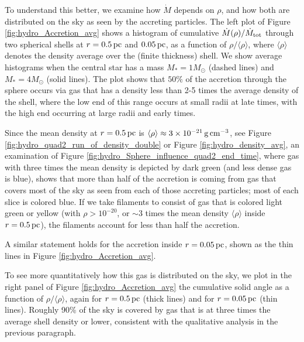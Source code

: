 \documentclass[../dissertation.tex]{subfiles}
\begin{document}
To understand this better, we examine how $\dot M$ depends on $\rho$, and how both
are distributed on the sky as seen by the accreting particles.
The left plot of Figure \ref{fig:hydro_Accretion_avg} shows a histogram of 
cumulative $\dot{M}(\rho)/\dot M_{\rm tot}$ through two spherical shells
at $r = 0.5 \,\rm pc$ and $0.05 \,\rm pc$, 
as a function of $\rho/\langle \rho\rangle$, where $\langle\rho\rangle$ 
denotes the density average over the (finite thickness) shell. 
We show average histograms when the central star has a mass $M_*=1M_\odot$ (dashed lines)
and $M_*=4M_\odot$ (solid lines).  The plot shows that $50\%$ of the accretion through the
sphere occurs via gas that has a density less than 2-5 times the average 
density of the shell,
where the low end of this range occurs at small radii at late times, with the high
end occurring at large radii and early times.

Since the mean density at $r=0.5\,\rm pc$ is 
$\langle\rho\rangle\approx 3\times10^{-21}\,\rm g\,\rm cm^{-3}$, see 
Figure \ref{fig:hydro_quad2_run_of_density_double} or Figure \ref{fig:hydro_density_avg}, an examination of 
Figure \ref{fig:hydro_Sphere_influence_quad2_end_time}, where gas with three times the 
mean density is depicted by dark green (and less dense gas is blue), shows that more than
half of the accretion is coming from gas that covers most of the sky as seen 
from each of those accreting particles; most of each slice is colored blue. If we take 
filaments to consist of gas that is
colored light green or yellow (with $\rho>10^{-20}$, or $\sim 3$ times 
the mean density $\langle\rho\rangle$ inside $r=0.5\,\rm pc$),
the filaments account for less than half the accretion.

A similar statement holds for the accretion inside $r=0.05\,\rm pc$, shown as the thin lines in Figure 
\ref{fig:hydro_Accretion_avg}.

To see more quantitatively how this gas is distributed on the sky,
we plot in the right panel of Figure \ref{fig:hydro_Accretion_avg} the cumulative solid 
angle as a function of $\rho/\langle \rho\rangle$, again for $r=0.5\,\rm pc$ (thick lines) 
and for $r=0.05\,\rm pc$ (thin lines).  Roughly 90\% of the sky is
covered by gas that is at three times the average shell density or lower, 
consistent with the qualitative analysis in the previous paragraph. 
\end{document}
